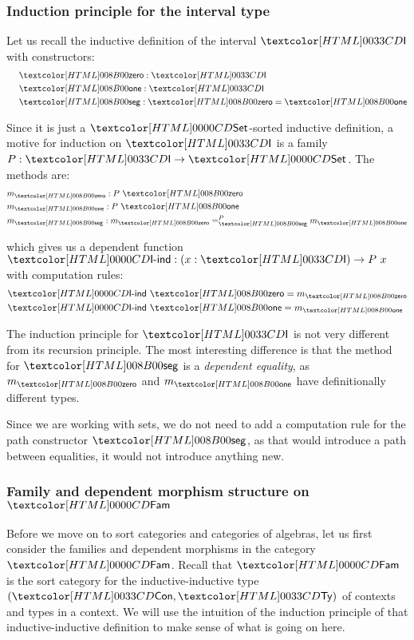 \subsubsection{Induction principle for the interval type}

Let us recall the inductive definition of the interval $\intty$ with
constructors:
\begin{align*}
  \constr{\intzero}{\intty} \\
  \constr{\intone}{\intty} \\
  \constr{\intseg}{\intzero = \intone}
\end{align*}

Since it is just a $\Set$-sorted inductive definition, a motive for
induction on $\intty$ is a family $P : \intty \to \Set$. The methods
are:
\begin{align*}
  &m_{\intzero} : P\ \intzero \\
  &m_{\intone} : P\ \intone \\
  &m_{\intseg} : \pathover{P}{\intseg}{m_{\intzero}}{m_{\intone}}
\end{align*}

which gives us a dependent function $\intind : (x : \intty) \to P\ x$
with computation rules:
\begin{align*}
  &\intind\ \intzero = m_{\intzero} \\
  &\intind\ \intone = m_{\intone} \\
\end{align*}

The induction principle for $\intty$ is not very different from its
recursion principle. The most interesting difference is that the
method for $\intseg$ is a \emph{dependent equality}, as $m_{\intzero}$
and $m_{\intone}$ have definitionally different types.

Since we are working with sets, we do not need to add a computation
rule for the path constructor $\intseg$, as that would introduce a
path between equalities, \ie it would not introduce anything new.

\subsubsection{Family and dependent morphism structure on $\Fam$}

Before we move on to sort categories and categories of algebras, let
us first consider the families and dependent morphisms in the category
$\Fam$. Recall that $\Fam$ is the sort category for the
inductive-inductive type $(\ttconty,\tttyty)$ of contexts and types in
a context. We will use the intuition of the induction principle of
that inductive-inductive definition to make sense of what is going on
here.

